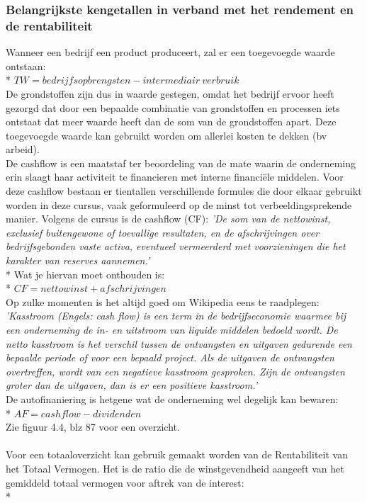 \documentclass[12pt]{article}
\begin{document}
\subsubsection{Belangrijkste kengetallen in verband met het rendement en de rentabiliteit}
Wanneer een bedrijf een product produceert, zal er een toegevoegde waarde ontstaan:\\*
$TW = bedrijfsopbrengsten - intermediair\ verbruik$\\
De grondstoffen zijn dus in waarde gestegen, omdat het bedrijf ervoor heeft gezorgd dat door een bepaalde combinatie van grondstoffen en processen iets ontstaat dat meer waarde heeft dan de som van de grondstoffen apart. Deze toegevoegde waarde kan gebruikt worden om allerlei kosten te dekken (bv arbeid).\\
De cashflow is een maatstaf ter beoordeling van de mate waarin de onderneming erin slaagt haar activiteit te financieren met interne financi\"ele middelen. Voor deze cashflow bestaan er tientallen verschillende formules die door elkaar gebruikt worden in deze cursus, vaak geformuleerd op de minst tot verbeeldingsprekende manier. Volgens de cursus is de cashflow (CF): \textit{'De som van de nettowinst, exclusief buitengewone of toevallige resultaten, en de afschrijvingen over bedrijfsgebonden vaste activa, eventueel vermeerderd met voorzieningen die het karakter van reserves aannemen.'}\\*
Wat je hiervan moet onthouden is:\\*
$CF = nettowinst + afschrijvingen$\\
Op zulke momenten is het altijd goed om Wikipedia eens te raadplegen: \textit{'Kasstroom (Engels: cash flow) is een term in de bedrijfseconomie waarmee bij een onderneming de in- en uitstroom van liquide middelen bedoeld wordt. De netto kasstroom is het verschil tussen de ontvangsten en uitgaven gedurende een bepaalde periode of voor een bepaald project. Als de uitgaven de ontvangsten overtreffen, wordt van een negatieve kasstroom gesproken. Zijn de ontvangsten groter dan de uitgaven, dan is er een positieve kasstroom.'}\\
De autofinaniering is hetgene wat de onderneming wel degelijk kan bewaren:\\*
$AF = cashflow - dividenden$\\
Zie figuur 4.4, blz 87 voor een overzicht.\\\\
Voor een totaaloverzicht kan gebruik gemaakt worden van de Rentabiliteit van het Totaal Vermogen. Het is de ratio die de winstgevendheid aangeeft van het gemiddeld totaal vermogen voor aftrek van de interest:\\*
\end{document}
